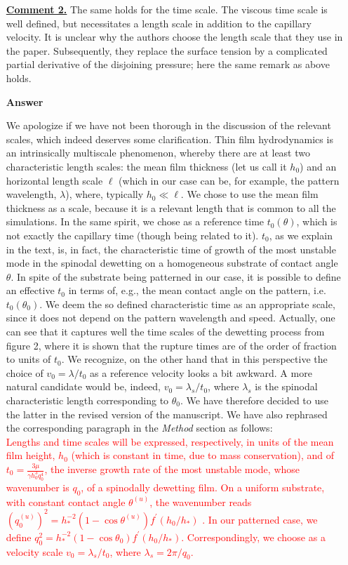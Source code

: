 \documentclass[12pt,english]{article}
\begin{document}
\begin{itemize}
\item[ \textbf{\underline{Comment 2.}}] 
{
The same holds for the time scale. 
The viscous time scale is well defined, but necessitates a length scale in addition to the 
capillary velocity. It is unclear why the authors choose the length scale that they use in the paper.
Subsequently, they replace the surface tension by a complicated partial derivative of the 
disjoining pressure; here the same remark as above holds.
}

\item[ \textbf{{Answer}}]
{
We apologize if we have not been thorough in the discussion of the relevant scales, which indeed deserves some clarification. 
Thin film hydrodynamics is an intrinsically multiscale phenomenon, whereby there are at least two characteristic length scales: the mean film thickness (let us call it $h_0$)
and an horizontal length scale $\ell$ (which in our case can be, for example, the pattern wavelength, $\lambda$), where, typically $h_0 \ll \ell$. We chose to use the mean 
film thickness as a scale, because it is a relevant length that is common to all the simulations.
In the same spirit, we chose as a reference time $t_0(\theta)$, which is not exactly the capillary time (though being related to it). 
$t_0$, as we explain in the text, is, in fact, the characteristic time of growth of the most unstable mode in the spinodal dewetting on a homogeneous
substrate of contact angle $\theta$. In spite of the substrate being patterned in our case, it is possible to define an effective $t_0$ in terms 
of, e.g., the mean contact angle on the pattern, i.e. $t_0(\theta_0)$. 
We deem the so defined characteristic time as an appropriate scale,
since it does not depend on the pattern wavelength and speed. Actually, one can see that it captures well the time scales of the dewetting process
from figure 2, where it is shown that the rupture times are of the order of fraction to units of $t_0$.
We recognize, on the other hand that in this perspective the choice of $v_0 = \lambda/t_0$ as a reference velocity looks a bit awkward.
A more natural candidate would be, indeed, $v_0=\lambda_s/t_0$, where $\lambda_s$ is the spinodal 
characteristic length corresponding to $\theta_0$. We have therefore decided to use the latter in the revised version of the manuscript.
We have also rephrased the corresponding paragraph in the {\it Method} section as follows: \\

\textcolor{red}{Lengths and time scales will be expressed, respectively, in units of the mean film height, $h_0$ (which is constant in time, due to mass conservation), and of $t_0 = \frac{3\mu}{\gamma h_0^3 q_0^4}$, the inverse growth rate of the most unstable mode, whose wavenumber is $q_0$, of a spinodally dewetting film. On a uniform substrate, with constant contact angle $\theta^{(u)}$, the wavenumber reads 
$(q^{(u)}_0)^2 = h_{\ast}^{-2}(1-\cos \theta^{(u)})f^{\prime}(h_0/h_{\ast})$ \cite{Mecke_2005,PhysRevE.100.023108}. In our patterned case, we define 
$q_0^2=h_{\ast}^{-2}(1-\cos\theta_0)f^{\prime}(h_0/h_{\ast})$.
Correspondingly, we choose as a velocity scale $v_0 = \lambda_s/t_0$, where $\lambda_s = 2\pi/q_0$.}

}
\end{itemize}
\end{document}

